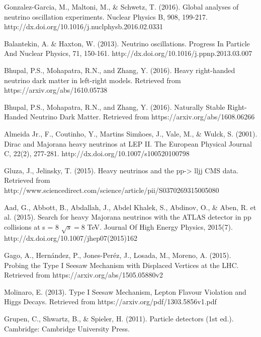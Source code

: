 \documentclass[11pt, oneside]{book}
\begin{document}
\begin{thebibliography}{10}

 Gonzalez-Garcia, M., Maltoni, M., \& Schwetz, T. (2016). Global analyses of neutrino oscillation experiments. Nuclear Physics B, 908, 199-217. http://dx.doi.org/10.1016/j.nuclphysb.2016.02.0331

 Balantekin, A. \& Haxton, W. (2013). Neutrino oscillations. Progress In Particle And Nuclear Physics, 71, 150-161. http://dx.doi.org/10.1016/j.ppnp.2013.03.007   
 
 Bhupal, P.S., Mohapatra, R.N., and Zhang, Y. (2016). Heavy right-handed neutrino dark matter in left-right models. Retrieved from https://arxiv.org/abs/1610.05738     

 Bhupal, P.S., Mohapatra, R.N., and Zhang, Y. (2016). Naturally Stable Right-Handed Neutrino Dark Matter. Retrieved from https://arxiv.org/abs/1608.06266

 Almeida Jr., F., Coutinho, Y., Martins Simñoes, J., Vale, M., \& Wulck, S. (2001). Dirac and Majorana heavy neutrinos at LEP II. The European Physical Journal C, 22(2), 277-281. http://dx.doi.org/10.1007/s100520100798  

  Gluza, J., Jelinsky, T. (2015). Heavy neutrinos and the pp-> lljj CMS data. Retrieved from http://www.sciencedirect.com/science/article/pii/S0370269315005080 

 Aad, G., Abbott, B., Abdallah, J., Abdel Khalek, S., Abdinov, O., \& Aben, R. et al. (2015). Search for heavy Majorana neutrinos with the ATLAS detector in pp collisions at s = 8 $ \sqrt{s}=8 $ TeV. Journal Of High Energy Physics, 2015(7). http://dx.doi.org/10.1007/jhep07(2015)162  

 Gago, A., Hernández, P., Jones-Peréz, J., Losada, M., Moreno, A. (2015). Probing the Type I Seesaw Mechanism with Displaced Vertices at the LHC. Retrieved from  https://arxiv.org/abs/1505.05880v2

 Molinaro, E. (2013). Type I Seesaw Mechanism, Lepton Flavour    	Violation and                                                                                                       Higgs Decays. Retrieved from https://arxiv.org/pdf/1303.5856v1.pdf

 Grupen, C., Shwartz, B., \& Spieler, H. (2011). Particle detectors (1st ed.). Cambridge: Cambridge University Press.


\end{thebibliography}
\end{document}
